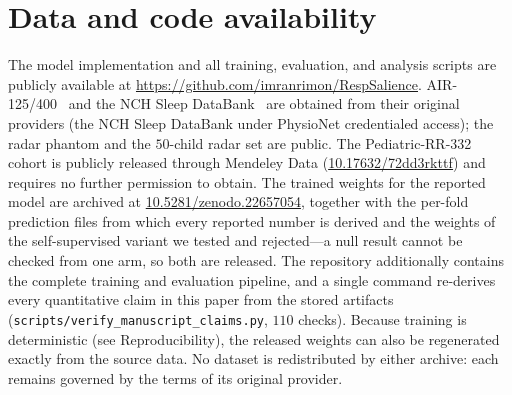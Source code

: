 \documentclass[journal]{IEEEtran}
\begin{document}
\section*{Data and code availability}
The model implementation and all training, evaluation, and analysis scripts are publicly available at
\url{https://github.com/imranrimon/RespSalience}. AIR-125/400~\cite{infant_air} and the NCH Sleep
DataBank~\cite{nchsdb} are obtained from their original providers (the NCH Sleep DataBank under PhysioNet
credentialed access); the radar phantom and the $50$-child radar set are public.
The Pediatric-RR-332 cohort is publicly released through Mendeley Data
(\href{https://doi.org/10.17632/72dd3rkttf.1}{10.17632/72dd3rkttf}) and requires no further permission to
obtain. The trained weights for the reported model are archived at
\href{https://doi.org/10.5281/zenodo.22657054}{10.5281/zenodo.22657054}, together with the per-fold
prediction files from which every reported number is derived and the weights of the self-supervised
variant we tested and rejected---a null result cannot be checked from one arm, so both are released.
The repository additionally contains the complete training and evaluation pipeline, and a single
command re-derives every quantitative claim in this paper from the stored artifacts
(\texttt{scripts/verify\_manuscript\_claims.py}, $110$ checks). Because training is deterministic
(see Reproducibility), the released weights can also be regenerated exactly from the source data. No
dataset is redistributed by either archive: each remains governed by the terms of its original
provider.
\end{document}
